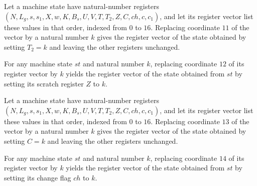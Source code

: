 \begin{lemma}
\label{Complexity.LogProg.ExpBFS.St.upd_T2}
\leanok
{}
Let a machine state have natural-number registers
$(N,L_g,s,s_1,X,w,K,B_s,U,V,T,T_2,Z,C,ch,c,c_1)$, and let its register vector list these
values in that order, indexed from $0$ to $16$. Replacing coordinate $11$ of the vector
by a natural number $k$ gives the register vector of the state obtained by setting
$T_2=k$ and leaving the other registers unchanged.
\end{lemma}

\begin{lemma}
\label{Complexity.LogProg.ExpBFS.St.upd_Z}
\leanok
{}
For any machine state $st$ and natural number $k$, replacing coordinate $12$ of its
register vector by $k$ yields the register vector of the state obtained from $st$ by
setting its scratch register $Z$ to $k$.
\end{lemma}

\begin{lemma}
\label{Complexity.LogProg.ExpBFS.St.upd_C}
\leanok
{}
Let a machine state have natural-number registers
$(N,L_g,s,s_1,X,w,K,B_s,U,V,T,T_2,Z,C,ch,c,c_1)$, and let its register vector list these
values in that order, indexed from $0$ to $16$. Replacing coordinate $13$ of the vector
by a natural number $k$ gives the register vector of the state obtained by setting $C=k$
and leaving the other registers unchanged.
\end{lemma}

\begin{lemma}
\label{Complexity.LogProg.ExpBFS.St.upd_ch}
\leanok
{}
For any machine state $st$ and natural number $k$, replacing coordinate $14$ of its
register vector by $k$ yields the register vector of the state obtained from $st$ by
setting its change flag $ch$ to $k$.
\end{lemma}

